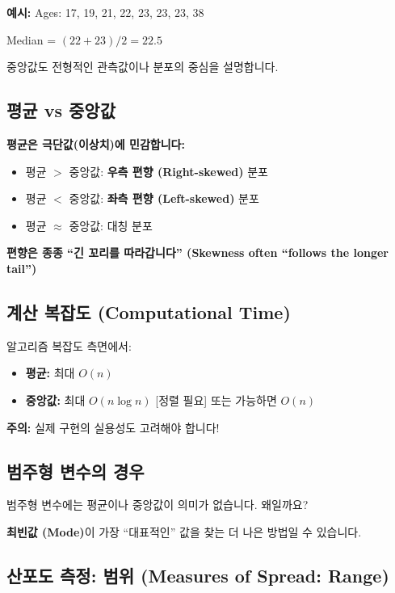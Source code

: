 \documentclass[12pt,a4paper]{article}
\begin{document}
\textbf{예시:} Ages: 17, 19, 21, 22, 23, 23, 23, 38

Median = $(22 + 23)/2 = 22.5$

중앙값도 전형적인 관측값이나 분포의 중심을 설명합니다.

\subsection{평균 vs 중앙값}

\textbf{평균은 극단값(이상치)에 민감합니다:}

\begin{itemize}
    \item 평균 $>$ 중앙값: \textbf{우측 편향 (Right-skewed)} 분포
    \item 평균 $<$ 중앙값: \textbf{좌측 편향 (Left-skewed)} 분포
    \item 평균 $\approx$ 중앙값: 대칭 분포
\end{itemize}

\textbf{편향은 종종 ``긴 꼬리를 따라갑니다'' (Skewness often ``follows the longer tail'')}

\subsection{계산 복잡도 (Computational Time)}

알고리즘 복잡도 측면에서:

\begin{itemize}
    \item \textbf{평균:} 최대 $O(n)$
    \item \textbf{중앙값:} 최대 $O(n \log n)$ [정렬 필요] 또는 가능하면 $O(n)$
\end{itemize}

\textbf{주의:} 실제 구현의 실용성도 고려해야 합니다!

\subsection{범주형 변수의 경우}

범주형 변수에는 평균이나 중앙값이 의미가 없습니다. 왜일까요?

\textbf{최빈값 (Mode)}이 가장 ``대표적인'' 값을 찾는 더 나은 방법일 수 있습니다.

\subsection{산포도 측정: 범위 (Measures of Spread: Range)}
\end{document}

